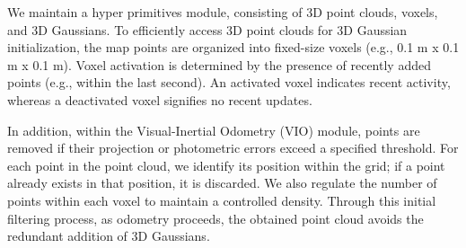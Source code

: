 \documentclass[lettersize,journal]{IEEEtran}
\begin{document}
We maintain a hyper primitives module, consisting of 3D point clouds, voxels, and 3D Gaussians. To efficiently access 3D point clouds for 3D Gaussian initialization, the map points are organized into fixed-size voxels (e.g., 0.1 m x 0.1 m x 0.1 m). Voxel activation is determined by the presence of recently added points (e.g., within the last second). An activated voxel indicates recent activity, whereas a deactivated voxel signifies no recent updates.

In addition, within the Visual-Inertial Odometry (VIO) module, points are removed if their projection or photometric errors exceed a specified threshold\cite{r3live}. For each point in the point cloud, we identify its position within the grid; if a point already exists in that position, it is discarded. We also regulate the number of points within each voxel to maintain a controlled density. Through this initial filtering process, as odometry proceeds, the obtained point cloud avoids the redundant addition of 3D Gaussians.
\end{document}
